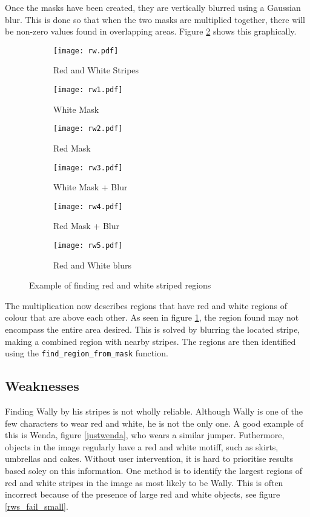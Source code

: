 \documentclass[../main.tex]{subfiles}
\begin{document}
    Once the masks have been created, they are vertically blurred using a Gaussian blur.
    This is done so that when the two masks are multiplied together, there will be non-zero values found in overlapping areas.
    Figure \ref{rw_example} shows this graphically.
    \begin{figure}[H]
      \centering
      \begin{subfigure}[B]{0.3\textwidth}
        \centering
        \texttt{[image: rw.pdf]}
        \caption{Red and White Stripes}
      \end{subfigure}
      \begin{subfigure}[B]{0.3\textwidth}
        \centering
        \texttt{[image: rw1.pdf]}
        \caption{White Mask}
      \end{subfigure}
      \begin{subfigure}[B]{0.3\textwidth}
        \centering
        \texttt{[image: rw2.pdf]}
        \caption{Red Mask}
      \end{subfigure}

      \begin{subfigure}[B]{0.3\textwidth}
        \centering
        \texttt{[image: rw3.pdf]}
        \caption{White Mask + Blur}
      \end{subfigure}
      \begin{subfigure}[B]{0.3\textwidth}
        \centering
        \texttt{[image: rw4.pdf]}
        \caption{Red Mask + Blur}
      \end{subfigure}
      \begin{subfigure}[B]{0.3\textwidth}
        \centering
        \texttt{[image: rw5.pdf]}
        \caption{Red and White blurs}
        \label{rw_stripe_ex}
      \end{subfigure}
      \caption{Example of finding red and white striped regions}
      \label{rw_example}
    \end{figure}
    The multiplication now describes regions that have red and white regions of colour that are above each other.
    As seen in figure \ref{rw_stripe_ex}, the region found may not encompass the entire area desired.
    This is solved by blurring the located stripe, making a combined region with nearby stripes.
    The regions are then identified using the \texttt{find\_region\_from\_mask} function.
  \subsection{Weaknesses}
    Finding Wally by his stripes is not wholly reliable.
    Although Wally is one of the few characters to wear red and white, he is not the only one.
    A good example of this is Wenda, figure \ref{justwenda}, who wears a similar jumper.
    Futhermore, objects in the image regularly have a red and white motiff, such as skirts, umbrellas and cakes.
    Without user intervention, it is hard to prioritise results based soley on this information.
    One method is to identify the largest regions of red and white stripes in the image as most likely to be Wally.
    This is often incorrect because of the presence of large red and white objects, see figure \ref{rws_fail_small}.
\end{document}
